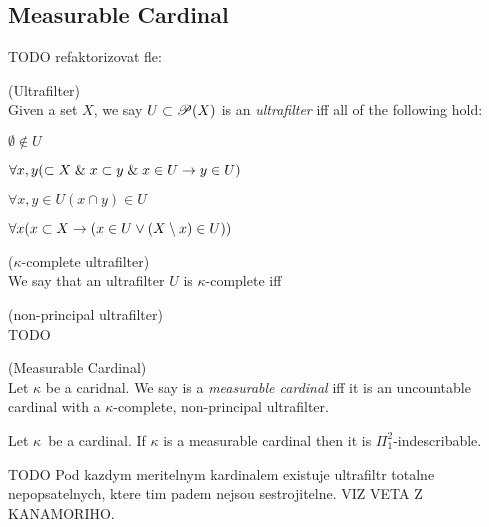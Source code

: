 \subsection{Measurable Cardinal}

TODO refaktorizovat fle:
\begin{definition}{(Ultrafilter)}\\
Given a set $X$, we say $U \subset \mathscr{P} (X)$ is an \emph{ultrafilter} iff all of the following hold:
\bce[(i)]
\item $\emptyset \not\in U$
\item $\forall x, y (\subset X \mathrel{\&} x \subset y \mathrel{\&} x \in U \rightarrow y \in U)$
\item $\forall x, y \in U (x \cap y) \in U$
\item $\forall x (x \subset X \rightarrow (x \in U \lor (X \setminus x) \in U))$
\ece
\end{definition}

\begin{definition}{($\kappa$-complete ultrafilter)}\\
We say that an ultrafilter $U$ is $\kappa$-complete iff
\end{definition}

\begin{definition}{(non-principal ultrafilter)}\\
TODO
\end{definition}

\begin{definition}{(Measurable Cardinal)}\\
Let $\kappa$ be a caridnal. We say is a \emph{measurable cardinal} iff it is an uncountable cardinal with a $\kappa$-complete, non-principal ultrafilter.
\end{definition}

\begin{theorem}
Let $\kappa$ be a cardinal. If $\kappa$ is a measurable cardinal then it is $\Pi^2_1$-indescribable.
\end{theorem}

\begin{theorem}
TODO Pod kazdym meritelnym kardinalem existuje ultrafiltr totalne nepopsatelnych, ktere tim padem nejsou sestrojitelne. VIZ VETA Z KANAMORIHO.
\end{theorem}


